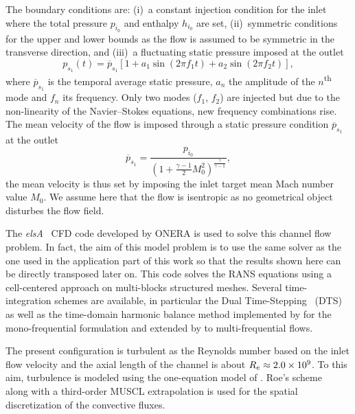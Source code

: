 The boundary conditions are: (i)~a constant injection condition for the inlet
where the total pressure $p_{i_0}$ and enthalpy $h_{i_0}$ are set,
(ii)~symmetric conditions for the upper and lower bounds as the flow
is assumed to be symmetric in the transverse direction, and (iii)~a
fluctuating static pressure imposed at the outlet
\begin{equation}
  p_{s_1}(t) = \overline{p}_{s_1} \left[1 + a_1 \sin(2 \pi f_1 t) +
    a_2 \sin(2 \pi f_2 t) \right],
  \label{eq:outlet_canal}
\end{equation}
where $\overline{p}_{s_1}$ is the temporal average static pressure, $a_n$ the
amplitude of the $n$\textsuperscript{th} mode and $f_n$ its
frequency. Only two modes ($f_1$, $f_2$) are injected
but due to the non-linearity of the Navier--Stokes equations,
new frequency combinations rise.
The mean velocity of the flow is imposed through a
static pressure condition $\overline{p}_{s_1}$ at the outlet
\begin{equation}
    \overline{p}_{s_1} = \frac{p_{i_0}}{\left(1 + 
    \frac{\gamma - 1}{2} M_{0}^2 \right) ^ {\frac{\gamma}{ \gamma - 1}}} ,
\end{equation}
the mean velocity is thus set by imposing the
inlet target mean Mach number value $M_{0}$.
We assume here that the flow is isentropic as no
geometrical object disturbes the flow field.

The \textit{elsA}~\cite{Cambier2013} CFD code developed by ONERA
is used to solve this channel flow problem. In fact, 
the aim of this model problem is 
to use the same
solver as the one used in the application part of this
work so that the results shown here can be directly
transposed later on.
This code solves the RANS equations using a cell-centered
approach on multi-blocks structured meshes.
Several time-integration schemes
are available, in particular the Dual Time-Stepping~\cite{Jameson1981} (DTS)
as well as the time-domain harmonic 
balance method implemented by \citet{ThesisSicot} for the mono-frequential
formulation and extended by \citet{ThesisGuedeney} to multi-frequential flows.


The present configuration is turbulent as the Reynolds number based on the
inlet flow velocity and the axial length of the channel is about $R_e
\approx 2.0\times 10^{9}$. To this aim, turbulence is modeled using the
one-equation model of \citet{Spalart1992}.
Roe's scheme~\cite{Roe1981} along with a third-order MUSCL extrapolation 
is used for the spatial discretization of
the convective fluxes. 

